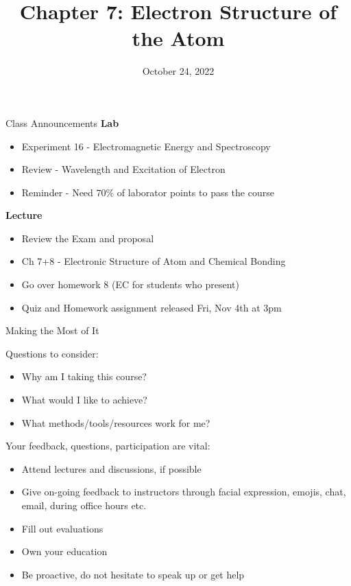 \documentclass[11pt]{beamer}
\title{Chapter 7: Electron Structure of the Atom}
\institute{Chemistry Department, Cypress College}
\date{October 24, 2022}
\begin{document}
\begin{frame}
  \titlepage
\end{frame}

\begin{frame}{Class Announcements}
  \textbf{Lab}
  \begin{itemize}
  \item Experiment 16 - Electromagnetic Energy and Spectroscopy
  \item Review - Wavelength and Excitation of Electron
  \item Reminder - Need $70\%$ of laborator points to pass
    the course
  \end{itemize}

  \textbf{Lecture}
  \begin{itemize}
  \item Review the Exam and proposal
  \item Ch 7+8 - Electronic Structure of Atom and Chemical Bonding
  \item Go over homework 8 (EC for students who present)
  \item Quiz and Homework assignment released Fri, Nov 4th at 3pm
  \end{itemize}
\end{frame}

\begin{frame}{Making the Most of It}

  Questions to consider:
  \begin{itemize}
  \item Why am I taking this course?
  \item What would I like to achieve?
  \item What methods/tools/resources work for me?
  \end{itemize}

  Your feedback, questions, participation are vital:
  \begin{itemize}
  \item Attend lectures and discussions, if possible
  \item Give on-going feedback to instructors through facial expression,
    emojis, chat, email, during office hours etc.
  \item Fill out evaluations
  \item Own your education
  \item Be proactive, do not hesitate to speak up or get help
  \end{itemize}

\end{frame}
\end{document}
